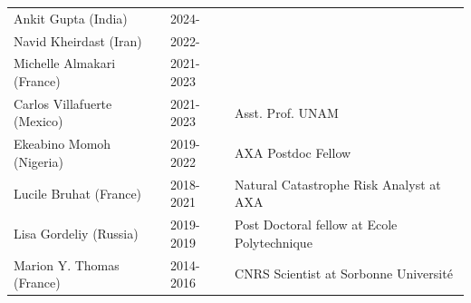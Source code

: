 \documentclass[10pt]{article}
\begin{document}
\begin{table}[h!]
 \renewcommand{\arraystretch}{0.5}

 
\begin{tabular}{L{6cm}L{2cm}D{7cm}}
\color{groy}Ankit Gupta (India)           & 2024-      &  \\
\color{groy}Navid Kheirdast (Iran)    	  & 2022-      &  \\
\color{gray}Michelle Almakari (France)    & 2021-2023  &  \\
\color{gray}Carlos Villafuerte (Mexico)   & 2021-2023  &  Asst. Prof. UNAM\\
\color{gray}Ekeabino Momoh (Nigeria)   	  & 2019-2022  &  AXA Postdoc Fellow\\
\color{gray}Lucile Bruhat (France)   	  & 2018-2021  &  Natural Catastrophe Risk Analyst at AXA\\
\color{gray}Lisa Gordeliy (Russia)   	  & 2019-2019  &  Post Doctoral fellow at Ecole Polytechnique\\
\color{gray}Marion Y. Thomas (France) 	  & 2014-2016  &  CNRS Scientist at Sorbonne Université\\[16pt]
\end{tabular}



\end{table}
\end{document}
